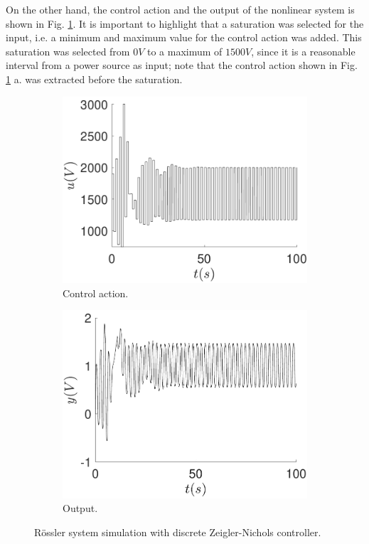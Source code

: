 	On the other hand, the control action and the output of the nonlinear system is shown in Fig. \ref{fig:zeigler}. It is important to highlight that a saturation was selected for the input, i.e. a minimum and maximum value for the control action was added. This saturation was selected from $0V$ to a maximum of $1500V$, since it is a reasonable interval from a power source as input; note that the control action shown in Fig. \ref{fig:zeigler} a. was extracted before the saturation.
	
    \begin{figure}
        \centering
        \begin{subfigure}[b]{0.475\textwidth}
            \centering
            \includegraphics[scale=0.425]{files/heuristic/zeigler/plot_control_zeigler.pdf}
            \caption{Control action.}
        \end{subfigure}
        \vskip0.1cm
        \begin{subfigure}[b]{0.475\textwidth}   
            \centering 
            \includegraphics[scale=0.425]{files/heuristic/zeigler/plot_y_zeigler.pdf}
            \caption{Output.}
        \end{subfigure}
        \caption{Rössler system simulation with discrete Zeigler-Nichols controller.}
        \label{fig:zeigler}
	\end{figure}
	

